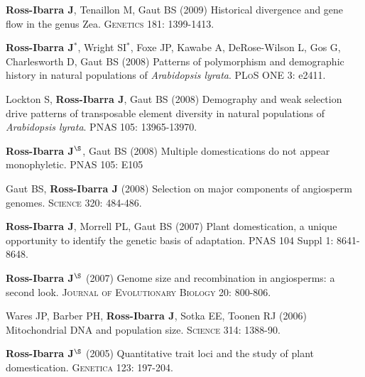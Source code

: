 \documentclass[letterpaper]{article}
\begin{document}
\begin{etaremune}
\item {\bf Ross-Ibarra J}, Tenaillon M, Gaut BS (2009) Historical divergence and gene flow in the genus Zea.  \textsc{Genetics} 181: 1399-1413.
\\%

\item {\bf Ross-Ibarra J}$^*$, Wright SI$^*$, Foxe JP, Kawabe A, DeRose-Wilson L, Gos G, Charlesworth D, Gaut BS (2008) Patterns of polymorphism and demographic history in natural populations of \emph{Arabidopsis lyrata}.  \textsc{PLoS ONE} 3: e2411.
\\%

\item Lockton S, {\bf Ross-Ibarra J}, Gaut BS (2008) Demography and weak selection drive patterns of transposable element diversity in natural populations of \emph{Arabidopsis lyrata}. PNAS 105: 13965-13970.
\\%

\item {\bf Ross-Ibarra J}$^\S$, Gaut BS (2008) Multiple domestications do not appear monophyletic. PNAS 105: E105
\\%

\item Gaut BS, {\bf Ross-Ibarra J} (2008) Selection on major components of angiosperm genomes.  \textsc{Science} 320: 484-486.
\\%

\item {\bf Ross-Ibarra J}, Morrell PL, Gaut BS (2007) Plant domestication, a unique opportunity to identify the genetic basis of adaptation. PNAS 104 Suppl 1: 8641-8648. 
\\%

\item {\bf Ross-Ibarra J}$^\S$ (2007) Genome size and recombination in angiosperms: a second look.  \textsc{Journal of Evolutionary Biology} 20: 800-806.
\\%

\item Wares JP, Barber PH, {\bf Ross-Ibarra J}, Sotka EE, Toonen RJ (2006) Mitochondrial DNA and population size.  \textsc{Science} 314: 1388-90.
\\%

\item {\bf Ross-Ibarra J}$^\S$ (2005) Quantitative trait loci and the study of plant domestication.  \textsc{Genetica} 123: 197-204. 
\\%


\end{etaremune}
\end{document}
